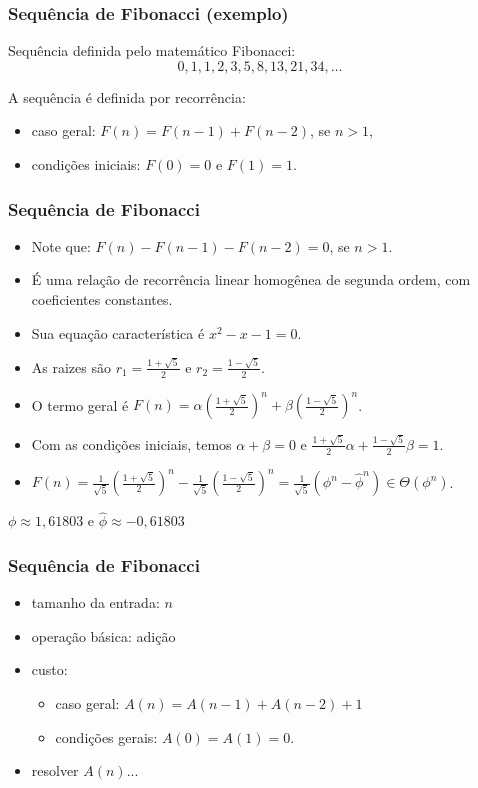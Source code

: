 \documentclass[handout]{beamer}
\begin{document}
\begin{frame}
\frametitle{Sequência de Fibonacci (exemplo)}

Sequência definida pelo matemático Fibonacci:
$$0, 1, 1, 2, 3, 5, 8, 13, 21, 34, \ldots$$

A sequência é definida por recorrência:
\begin{itemize}
\item caso geral: $F(n) = F(n-1) + F(n-2)$, se $n > 1$, 
\item condições iniciais: $F(0) = 0$ e $F(1) = 1$.
\end{itemize}

\end{frame}

\begin{frame}
\frametitle{Sequência de Fibonacci}

\begin{itemize}
\item Note que: $F(n) - F(n-1) - F(n-2) = 0$, se $n > 1$. 

\item É uma relação de recorrência linear homogênea de segunda ordem, com
  coeficientes constantes.

\item Sua equação característica é $x^2 - x - 1 = 0$.

\item As raizes são $r_1 = \frac{1+\sqrt{5}}{2}$ e $r_2 = \frac{1-\sqrt{5}}{2}$.

\item O termo geral é $F(n) = \alpha(\frac{1+\sqrt{5}}{2})^n + \beta(\frac{1-\sqrt{5}}{2})^n$.

\item Com as condições iniciais, temos $\alpha + \beta = 0$ e $\frac{1+\sqrt{5}}{2}\alpha + \frac{1-\sqrt{5}}{2}\beta = 1$.

\item $F(n) = \frac{1}{\sqrt{5}}(\frac{1+\sqrt{5}}{2})^n - \frac{1}{\sqrt{5}}(\frac{1-\sqrt{5}}{2})^n = \frac{1}{\sqrt{5}}(\phi^n - \hat{\phi}^n) \in \Theta(\phi^n)$.
\end{itemize}
$\phi \approx 1,61803$ e $\hat{\phi} \approx - 0,61803$
\end{frame}

\begin{frame}
\frametitle{Sequência de Fibonacci}

\begin{example}[Fibonacci]

\end{example}
\pause
\begin{itemize}
\item tamanho da entrada: $n$
\item operação básica: adição
\item custo:
\begin{itemize}
\item caso geral: $A(n) = A(n-1) + A(n-2) + 1$
\item condições gerais: $A(0) = A(1) = 0$.
\end{itemize}
\item resolver $A(n)$...
\end{itemize}
\end{frame}
\end{document}

